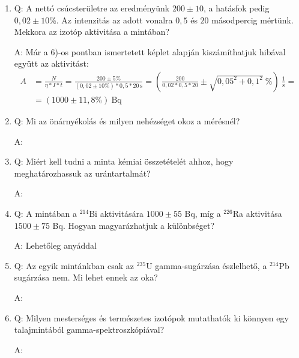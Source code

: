 \begin{enumerate}
    \item Q: A nettó csúcsterületre az eredményünk $200 \pm 10$, a hatásfok pedig $0,02 \pm 10$\%. Az intenzitás az adott vonalra $0,5$ és $20$ másodpercig mértünk. Mekkora az izotóp aktivitása a mintában?
    \begin{displayquote}
        A: Már a $6$)-os pontban ismertetett képlet alapján kiszámíthatjuk hibával együtt az aktivitást:
        \begin{align}
            A
            &=
            \frac{N}{\eta * I * t}
            =
            \frac{200 \pm 5\%}{\left( 0,02 \pm 10\% \right) * 0,5 * 20\ \text{s}}
            =
            \left( \frac{200}{0,02 * 0,5 * 20} \pm \sqrt{0,05^{2} + 0,1^{2}}\ \% \right)\ \frac{1}{\text{s}}
            = \nonumber \\
            &=
            \left( 1000 \pm 11,8\% \right)\ \text{Bq}
        \end{align}
    \end{displayquote}
    
    \item Q: Mi az önárnyékolás és milyen nehézséget okoz a mérésnél?
    \begin{displayquote}
        A: 
    \end{displayquote}
    
    \item Q: Miért kell tudni a minta kémiai összetételét ahhoz, hogy meghatározhassuk az urántartalmát?
    \begin{displayquote}
        A: 
    \end{displayquote}
    
    \item Q: A mintában a $^{214}$Bi aktivitására $1000 \pm 55$ Bq, míg a $^{226}$Ra aktivitása $1500 \pm 75$ Bq. Hogyan magyarázhatjuk a különbséget?
    \begin{displayquote}
        A: Lehetőleg anyáddal
    \end{displayquote}
    
    \item Q: Az egyik mintánkban csak az $^{235}$U gamma-sugárzása észlelhető, a $^{214}$Pb sugárzása nem. Mi lehet ennek az oka?
    \begin{displayquote}
        A: 
    \end{displayquote}
    
    \item Q: Milyen mesterséges és természetes izotópok mutathatók ki könnyen egy talajmintából gamma-spektroszkópiával?
    \begin{displayquote}
        A: 
    \end{displayquote}
\end{enumerate}